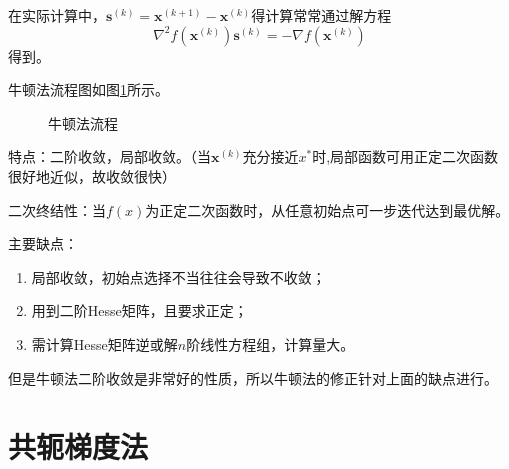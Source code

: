 \documentclass{book}
\begin{document}
在实际计算中，$\boldsymbol{s}^{(k)}=\boldsymbol{x}^{(k+1)}-\boldsymbol{x}^{(k)}$得计算常常通过解方程
$$
    \nabla^2f(\boldsymbol{x}^{(k)})\boldsymbol{s}^{(k)}=-\nabla f(\boldsymbol{x}^{(k)})
$$
得到。

牛顿法流程图如图\ref{fig:flow of unconstrained Newton's method}所示。

\begin{figure}[ht]
    \centering
    
    \caption{牛顿法流程}
    \label{fig:flow of unconstrained Newton's method}
\end{figure}


特点：二阶收敛，局部收敛。（当$\boldsymbol{x}^{(k)}$充分接近$x^*$时,局部函数可用正定二次函数很好地近似，故收敛很快）

二次终结性：当$f(x)$为正定二次函数时，从任意初始点可一步迭代达到最优解。

主要缺点：
\begin{enumerate}
    \item 局部收敛，初始点选择不当往往会导致不收敛；
    \item 用到二阶Hesse矩阵，且要求正定；
    \item 需计算Hesse矩阵逆或解$n$阶线性方程组，计算量大。
\end{enumerate}

但是牛顿法二阶收敛是非常好的性质，所以牛顿法的修正针对上面的缺点进行。

\section{共轭梯度法}
\end{document}
